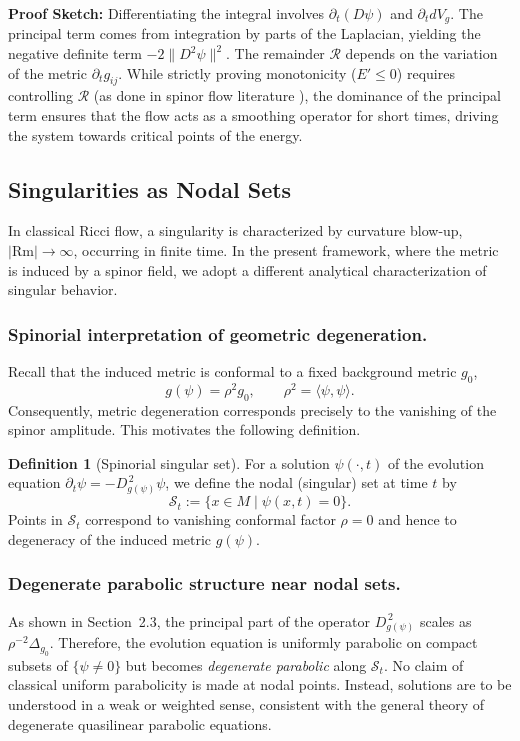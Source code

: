 \documentclass[11pt, reqno, a4paper]{amsart}
\theoremstyle{definition}
\newtheorem{definition}[theorem]{Definition}
\theoremstyle{remark}
\begin{document}
\textbf{Proof Sketch:} Differentiating the integral involves $\partial_t (D\psi)$ and $\partial_t dV_g$. The principal term comes from integration by parts of the Laplacian, yielding the negative definite term $-2\|D^2\psi\|^2$. The remainder $\mathcal{R}$ depends on the variation of the metric $\partial_t g_{ij}$.
While strictly proving monotonicity ($E' \leq 0$) requires controlling $\mathcal{R}$ (as done in spinor flow literature \cite{ammann2012}), the dominance of the principal term ensures that the flow acts as a smoothing operator for short times, driving the system towards critical points of the energy.

\subsection{Singularities as Nodal Sets}
\label{sec:nodal_sets}

In classical Ricci flow, a singularity is characterized by curvature blow-up,
$\lvert \mathrm{Rm} \rvert \to \infty$, occurring in finite time.
In the present framework, where the metric is induced by a spinor field,
we adopt a different analytical characterization of singular behavior.

\subsubsection{Spinorial interpretation of geometric degeneration.}
Recall that the induced metric is conformal to a fixed background metric $g_0$,
\[
g(\psi) = \rho^2 g_0, \qquad \rho^2 = \langle \psi , \psi \rangle .
\]
Consequently, metric degeneration corresponds precisely to the vanishing of the
spinor amplitude. This motivates the following definition.

\begin{definition}[Spinorial singular set]
For a solution $\psi(\cdot,t)$ of the evolution equation
$\partial_t \psi = -D_{g(\psi)}^{\,2}\psi$, we define the nodal (singular) set at time $t$ by
\[
\mathcal{S}_t := \{ x \in M \mid \psi(x,t) = 0 \}.
\]
Points in $\mathcal{S}_t$ correspond to vanishing conformal factor $\rho=0$ and hence
to degeneracy of the induced metric $g(\psi)$.
\end{definition}

\subsubsection{Degenerate parabolic structure near nodal sets.}
As shown in Section~2.3, the principal part of the operator $D_{g(\psi)}^{\,2}$
scales as $\rho^{-2} \Delta_{g_0}$. Therefore, the evolution equation is uniformly
parabolic on compact subsets of $\{\psi \neq 0\}$ but becomes \emph{degenerate
parabolic} along $\mathcal{S}_t$.
No claim of classical uniform parabolicity is made at nodal points.
Instead, solutions are to be understood in a weak or weighted sense,
consistent with the general theory of degenerate quasilinear parabolic equations.
\end{document}

